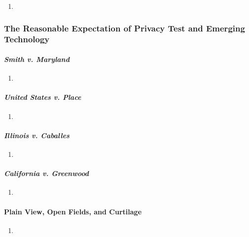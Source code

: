\begin{enumerate}
    \item 
\end{enumerate}

\subsubsection{The Reasonable Expectation of Privacy Test and Emerging 
Technology}

\paragraph{\emph{Smith v. Maryland}} %

\begin{enumerate}
    \item 
\end{enumerate}

\paragraph{\emph{United States v. Place}} %

\begin{enumerate}
    \item 
\end{enumerate}

\paragraph{\emph{Illinois v. Caballes}} %

\begin{enumerate}
    \item 
\end{enumerate}

\paragraph{\emph{California v. Greenwood}} %

\begin{enumerate}
    \item 
\end{enumerate}

\paragraph{Plain View, Open Fields, and Curtilage} %

\begin{enumerate}
    \item 
\end{enumerate}


